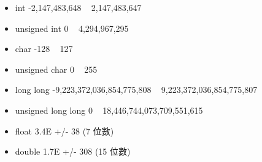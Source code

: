 \begin{itemize}
\item int                 -2,147,483,648 ~ 2,147,483,647
\item unsigned int	      0 ~ 4,294,967,295
\item char                -128 ~ 127
\item unsigned char       0 ~ 255
\item long long           -9,223,372,036,854,775,808 ~ 9,223,372,036,854,775,807
\item unsigned long long  0 ~ 18,446,744,073,709,551,615
\item float               3.4E +/- 38 (7 位數)
\item double              1.7E +/- 308 (15 位數)
\end{itemize}